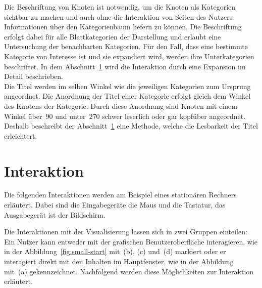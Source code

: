 Die Beschriftung von Knoten ist notwendig, um die Knoten als Kategorien sichtbar zu machen und auch ohne die Interaktion von Seiten des Nutzers Informationen über den Kategorienbaum liefern zu können.
Die Beschriftung erfolgt dabei für alle Blattkategorien der Darstellung und erlaubt eine Untersuchung der benachbarten Kategorien.
Für den Fall, dass eine bestimmte Kategorie von Interesse ist und sie expandiert wird, werden ihre Unterkategorien beschriftet.
In dem Abschnitt~\ref{subchap:interaktion} wird die Interaktion durch eine Expansion im Detail beschrieben.\\
Die Titel werden im selben Winkel wie die jeweiligen Kategorien zum Ursprung angeordnet.
Die Anordnung der Titel einer Kategorie erfolgt gleich dem Winkel des Knotens der Kategorie.
Durch diese Anordnung sind Knoten mit einem Winkel über~90\textdegree{} und unter~270\textdegree{} schwer leserlich oder gar kopfüber angeordnet.
Deshalb beschreibt der Abschnitt~\ref{subchap:interaktion} eine Methode, welche die Lesbarkeit der Titel erleichtert.


\section{Interaktion} \label{subchap:interaktion}
Die folgenden Interaktionen werden am Beispiel eines stationären Rechners erläutert.
Dabei sind die Eingabegeräte die Maus und die Tastatur, das Ausgabegerät ist der Bildschirm.

Die Interaktionen mit der Visualisierung lassen sich in zwei Gruppen einteilen: Ein Nutzer kann entweder mit der grafischen Benutzeroberfläche interagieren, wie in der Abbildung~\ref{fig:small-start} mit~(b), (c) und~(d) markiert oder er interagiert direkt mit den Inhalten im Hauptfenster, wie in der Abbildung mit~(a) gekennzeichnet.
Nachfolgend werden diese Möglichkeiten zur Interaktion erläutert.

